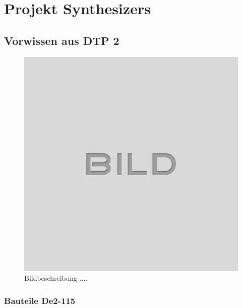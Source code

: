 
\chapter{Projekt Synthesizers}\label{chap.syntehsizer_projekt}

\section{Vorwissen aus DTP 2}\label{sect.synthesizer_dtp2}


\begin{figure}[H]
	\centering
	\includegraphics[width=\textwidth]{images/idle.png}
	\caption{Bildbeschreibung ....}
	\label{fig.synthesizer_}
\end{figure}

\subsection{Bauteile De2-115}\label{sect.synthesizer_dtp2_DE2115}
